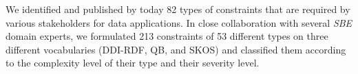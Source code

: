 \documentclass[conference]{IEEEtran}
\begin{document}


We identified and published by today 82 types of constraints  that are required by various stakeholders for data applications.
In close collaboration with several \emph{SBE} domain experts, we formulated 213 constraints of 53 different types on three different vocabularies (DDI-RDF, QB, and SKOS) and classified them according to the complexity level of their type and their severity level. 
\end{document}
